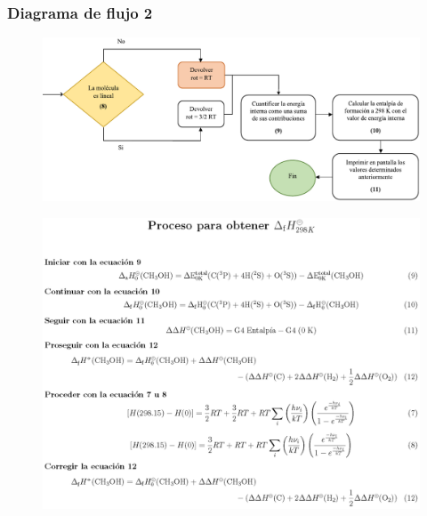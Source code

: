 \documentclass{beamer}
\begin{document}
\begin{frame}
\frametitle{Diagrama de flujo 2}
\begin{center}
\begin{figure}[h!]
\includegraphics[scale=.57]{images/df2}
\end{figure}
\end{center}
\end{frame}
\begin{frame}

\begin{center}
\begin{figure}[h]
\includegraphics[scale=.5]{images/pe}
\end{figure}
\end{center}
\end{frame}
\end{document}
